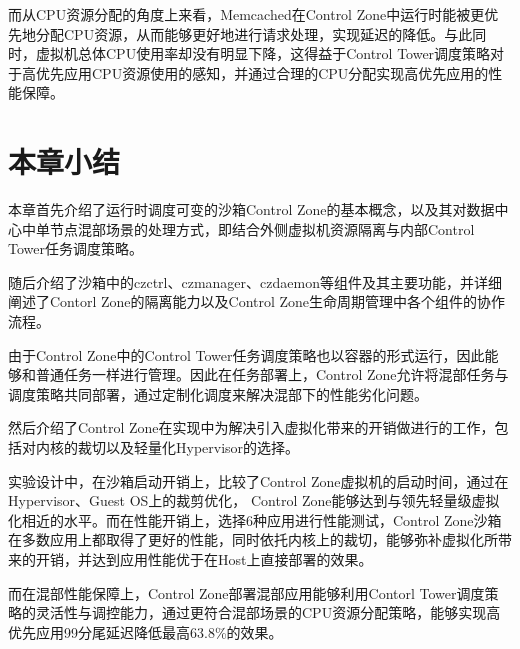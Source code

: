 而从CPU资源分配的角度上来看，Memcached在Control Zone中运行时能被更优先地分配CPU资源，从而能够更好地进行请求处理，实现延迟的降低。与此同时，虚拟机总体CPU使用率却没有明显下降，这得益于Control Tower调度策略对于高优先应用CPU资源使用的感知，并通过合理的CPU分配实现高优先应用的性能保障。


\section{本章小结}

本章首先介绍了运行时调度可变的沙箱Control Zone的基本概念，以及其对数据中心中单节点混部场景的处理方式，即结合外侧虚拟机资源隔离与内部Control Tower任务调度策略。

随后介绍了沙箱中的czctrl、czmanager、czdaemon等组件及其主要功能，并详细阐述了Contorl Zone的隔离能力以及Control Zone生命周期管理中各个组件的协作流程。

由于Control Zone中的Control Tower任务调度策略也以容器的形式运行，因此能够和普通任务一样进行管理。因此在任务部署上，Control Zone允许将混部任务与调度策略共同部署，通过定制化调度来解决混部下的性能劣化问题。

然后介绍了Control Zone在实现中为解决引入虚拟化带来的开销做进行的工作，包括对内核的裁切以及轻量化Hypervisor的选择。

实验设计中，在沙箱启动开销上，比较了Control Zone虚拟机的启动时间，通过在Hypervisor、Guest OS上的裁剪优化， Control Zone能够达到与领先轻量级虚拟化相近的水平。而在性能开销上，选择6种应用进行性能测试，Control Zone沙箱在多数应用上都取得了更好的性能，同时依托内核上的裁切，能够弥补虚拟化所带来的开销，并达到应用性能优于在Host上直接部署的效果。

而在混部性能保障上，Control Zone部署混部应用能够利用Contorl Tower调度策略的灵活性与调控能力，通过更符合混部场景的CPU资源分配策略，能够实现高优先应用99分尾延迟降低最高63.8\%的效果。